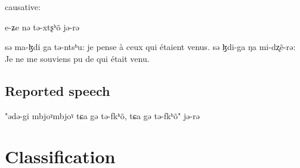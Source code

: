\documentclass[oneside,a4paper,11pt]{article}
\begin{document}
causative:

e-ʑe nə tə-xtʂʰõ jə-rə


		sə ma-ɮdi ga tə-ntsʰu: je pense à ceux qui étaient venus.
		sə ɮdi-ga ŋa mi-dʐẽ-rə: Je ne me souviens pu de qui était venu.
\subsection{Reported speech} 
		"ədə-gi mbjoˠmbjoˠ tɕa gə tə-fkʰõ, tɕa gə tə-fkʰõ" jə-rə
		
\section{Classification} \label{sec:classification}
 
 
  \citet{lai14person}



\end{document}
